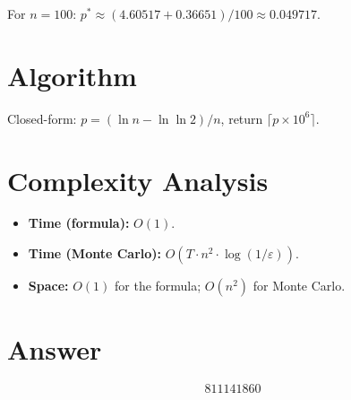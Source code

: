 \documentclass[11pt]{article}
\theoremstyle{definition}
\begin{document}
For $n = 100$: $p^* \approx (4.60517 + 0.36651)/100 \approx 0.049717$.

\section{Algorithm}

Closed-form: $p = (\ln n - \ln\ln 2)/n$, return $\lceil p \times 10^6 \rceil$.

\section{Complexity Analysis}

\begin{itemize}
    \item \textbf{Time (formula):} $O(1)$.
    \item \textbf{Time (Monte Carlo):} $O(T \cdot n^2 \cdot \log(1/\varepsilon))$.
    \item \textbf{Space:} $O(1)$ for the formula; $O(n^2)$ for Monte Carlo.
\end{itemize}

\section{Answer}

\[
\boxed{811141860}
\]
\end{document}
